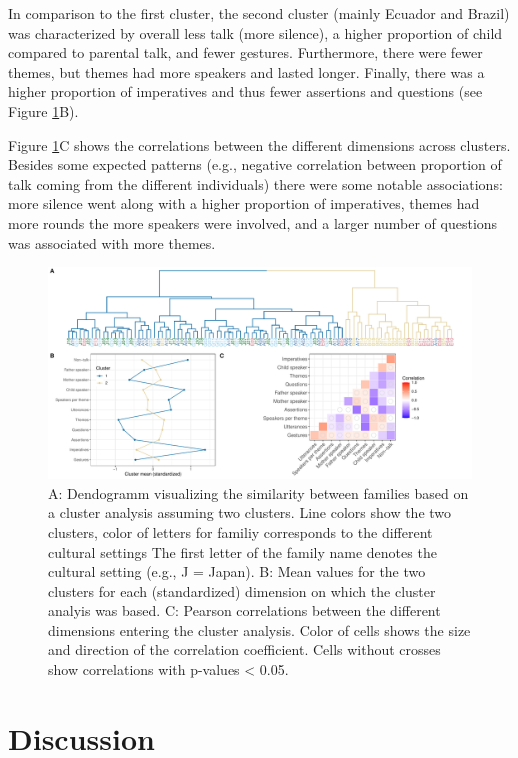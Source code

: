 \documentclass[
  man,floatsintext]{apa6}
\begin{document}
In comparison to the first cluster, the second cluster (mainly Ecuador and Brazil) was characterized by overall less talk (more silence), a higher proportion of child compared to parental talk, and fewer gestures. Furthermore, there were fewer themes, but themes had more speakers and lasted longer. Finally, there was a higher proportion of imperatives and thus fewer assertions and questions (see Figure \ref{fig:fig4}B).

Figure \ref{fig:fig4}C shows the correlations between the different dimensions across clusters. Besides some expected patterns (e.g., negative correlation between proportion of talk coming from the different individuals) there were some notable associations: more silence went along with a higher proportion of imperatives, themes had more rounds the more speakers were involved, and a larger number of questions was associated with more themes.

\begin{figure}
\includegraphics[width=1\linewidth]{../visuals/fig4} \caption{A: Dendogramm visualizing the similarity between families based on a cluster analysis assuming  two clusters. Line colors show the two clusters, color of letters for familiy corresponds to the different cultural settings The first letter of the family name denotes the cultural setting (e.g., J = Japan). B: Mean values for the two clusters for each (standardized) dimension on which the cluster analyis was based. C: Pearson correlations between the different dimensions entering the cluster analysis. Color of cells shows the size and direction of the correlation coefficient. Cells without crosses show correlations with p-values < 0.05.}\label{fig:fig4}
\end{figure}

\hypertarget{discussion}{%
\section{Discussion}\label{discussion}}
\end{document}
